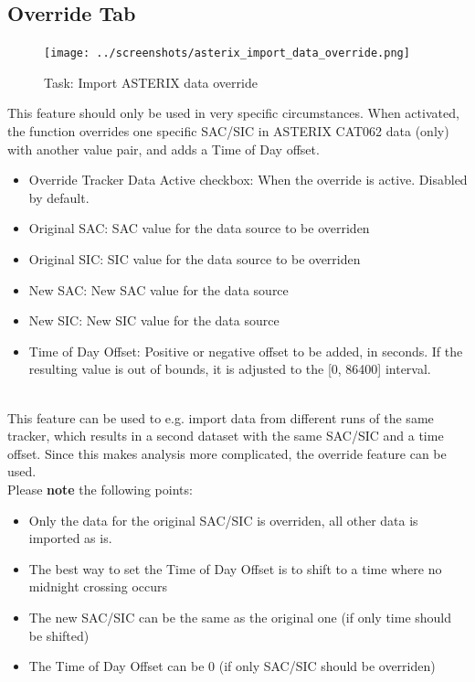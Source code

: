 \subsection{Override Tab}
\label{sec:task_import_asterix_override}


\begin{figure}[H]
  \center
    \texttt{[image: ../screenshots/asterix\_import\_data\_override.png]}
  \caption{Task: Import ASTERIX data override}
\end{figure}

This feature should only be used in very specific circumstances. When activated, the function overrides one specific SAC/SIC in ASTERIX CAT062 data (only) with another value pair, and adds a Time of Day offset. \\

\begin{itemize}  
\item Override Tracker Data Active checkbox: When the override is active. Disabled by default.
\item Original SAC: SAC value for the data source to be overriden
\item Original SIC: SIC value for the data source to be overriden
\item New SAC: New SAC value for the data source
\item New SIC: New SIC value for the data source
\item Time of Day Offset: Positive or negative offset to be added, in seconds. If the resulting value is out of bounds, it is adjusted to the [0, 86400] interval.
\end{itemize}
\ \\

This feature can be used to e.g. import data from different runs of the same tracker, which results in a second dataset with the same SAC/SIC and a time offset. Since this makes analysis more complicated, the override feature can be used. \\

Please \textbf{note} the following points:

\begin{itemize}  
\item Only the data for the original SAC/SIC is overriden, all other data is imported as is.
\item The best way to set the Time of Day Offset is to shift to a time where no midnight crossing occurs
\item The new SAC/SIC can be the same as the original one (if only time should be shifted)
\item The Time of Day Offset can be 0 (if only SAC/SIC should be overriden)
\end{itemize}

